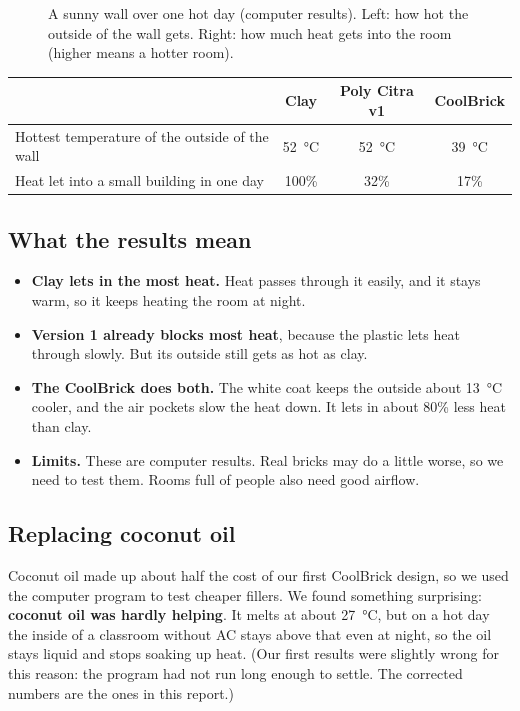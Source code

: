 \documentclass[11pt,a4paper]{article}
\begin{document}
\begin{figure}[H]
\caption{A sunny wall over one hot day (computer results). Left: how hot the outside of the wall gets. Right: how much heat gets into the room (higher means a hotter room).}
\end{figure}

\begin{center}
\begin{tabular}{lccc}
\toprule
 & Clay & Poly Citra v1 & CoolBrick \\
\midrule
Hottest temperature of the outside of the wall & \SI{52}{\celsius} & \SI{52}{\celsius} & \SI{39}{\celsius} \\
Heat let into a small building in one day & 100\% & 32\% & 17\% \\
\bottomrule
\end{tabular}
\end{center}

\subsection{What the results mean}
\begin{itemize}
  \item \textbf{Clay lets in the most heat.} Heat passes through it easily,
        and it stays warm, so it keeps heating the room at night.
  \item \textbf{Version 1 already blocks most heat}, because the plastic
        lets heat through slowly. But its outside still gets as hot as clay.
  \item \textbf{The CoolBrick does both.} The white coat keeps the outside
        about \SI{13}{\celsius} cooler, and the air pockets slow the heat
        down. It lets in about 80\% less heat than clay.
  \item \textbf{Limits.} These are computer results. Real bricks may do a
        little worse, so we need to test them. Rooms full of people also need
        good airflow.
\end{itemize}

\subsection{Replacing coconut oil}
Coconut oil made up about half the cost of our first CoolBrick design, so we
used the computer program to test cheaper fillers. We found something
surprising: \textbf{coconut oil was hardly helping}. It melts at about
\SI{27}{\celsius}, but on a hot day the inside of a classroom without AC
stays above that even at night, so the oil stays liquid and stops soaking up
heat. (Our first results were slightly wrong for this reason: the program had
not run long enough to settle. The corrected numbers are the ones in this
report.)
\end{document}
